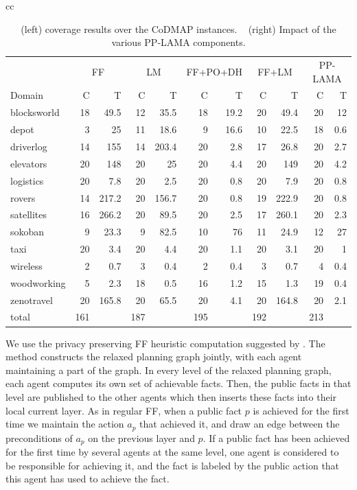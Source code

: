 \documentclass[letterpaper]{article}
\theoremstyle{definition}
\begin{document}
\begin{table}
\begin{tabular}{cc}
\begin{minipage}{.55\textwidth}
{\begin{tabular}{l||r|r||r|r||r|r||r|r||r|r}
			&\multicolumn{2}{c|}{FF}&\multicolumn{2}{c||}{LM}&\multicolumn{2}{c||}{FF+PO+DH}&\multicolumn{2}{c||}{FF+LM}&\multicolumn{2}{c}{PP-LAMA} 		\\ 
Domain&C&T&C&T&C&T&C&T&C&T \\ \hline
blocksworld	&18&49.5	&12&35.5	&18&19.2	&20&49.4	&20&12	\\ 
depot	&3&25	&11&18.6	&9&16.6	&10&22.5	&18&0.6	\\ 
driverlog	&14&155	&14&203.4	&20&2.8	&17&26.8	&20&2.7	\\ 
elevators	&20&148	&20&25	&20&4.4	&20&149	&20&4.2	\\ 
logistics	&20&7.8	&20&2.5	&20&0.8	&20&7.9	&20&0.8	\\ 
rovers	&14&217.2	&20&156.7	&20&0.8	&19&222.9	&20&0.8	\\ 
satellites	&16&266.2	&20&89.5	&20&2.5	&17&260.1	&20&2.3	\\ 
sokoban	&9&23.3	&9&82.5	&10&76	&11&24.9	&12&27	\\ 
taxi	&20&3.4	&20&4.4	&20&1.1	&20&3.1	&20&1	\\ 
wireless	&2&0.7	&3&0.4	&2&0.4	&3&0.7	&4&0.4	\\ 
woodworking	&5&2.3	&18&0.5	&16&1.2	&15&1.3	&19&0.4	\\ 
zenotravel	&20&165.8	&20&65.5	&20&4.1	&20&164.8	&20&2.1	\\ \hline
total	&161&	&187&	&195&	&192&	& 213&	\\ 
\end{tabular}
}
    \end{minipage} 
\end{tabular}
\caption{(left) coverage results over the CoDMAP instances. ~ (right) Impact of the various PP-LAMA components.}
\label{tab:results}
\end{table}


We use the privacy preserving FF heuristic computation suggested by \cite{vstolba2015admissible}. The method constructs the relaxed planning graph jointly, with each agent maintaining a part of the graph. In every level of the relaxed planning graph, each agent computes its own set of achievable facts. Then, the public facts in that level are published to the other agents which then inserts these facts into their local current layer. As in regular FF, when 
a public fact $p$ is achieved for the first time we maintain the action $a_p$ that achieved it, and draw an edge between the preconditions of $a_p$ on the previous layer and $p$. If a public fact has been achieved for the first time by several agents at the same level, one agent is considered to be responsible for achieving it, and the fact is labeled by the public action that this agent has used to achieve the fact.
\end{document}
